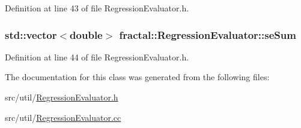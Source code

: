 Definition at line 43 of file Regression\+Evaluator.\+h.

\hypertarget{classfractal_1_1RegressionEvaluator_a5a0d13a04c2e3b8d82a85a6fa59a4abf}{
\subsubsection[{se\+Sum}]{\setlength{\rightskip}{0pt plus 5cm}std\+::vector$<$double$>$ fractal\+::\+Regression\+Evaluator\+::se\+Sum\hspace{0.3cm}{\ttfamily [protected]}}}\label{classfractal_1_1RegressionEvaluator_a5a0d13a04c2e3b8d82a85a6fa59a4abf}


Definition at line 44 of file Regression\+Evaluator.\+h.



The documentation for this class was generated from the following files\+:\begin{DoxyCompactItemize}
\item 
src/util/\hyperlink{RegressionEvaluator_8h}{Regression\+Evaluator.\+h}\item 
src/util/\hyperlink{RegressionEvaluator_8cc}{Regression\+Evaluator.\+cc}\end{DoxyCompactItemize}
